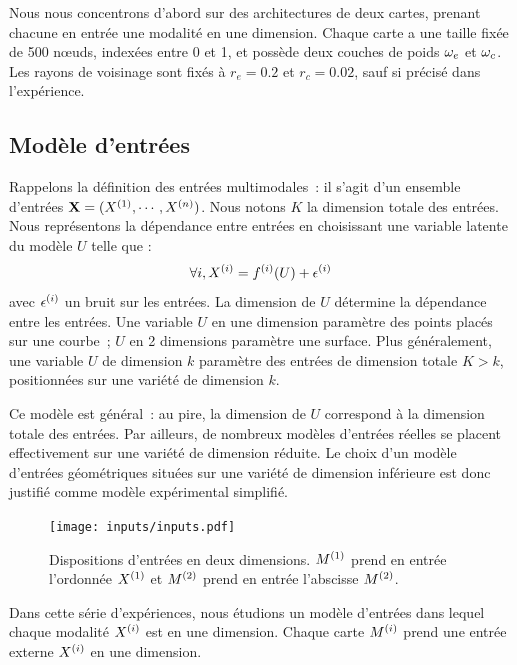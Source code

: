 \documentclass[../main]{subfiles}
\begin{document}
Nous nous concentrons d'abord sur des architectures de deux cartes, prenant chacune en entrée une modalité en une dimension.
Chaque carte a une taille fixée de 500 n\oe{}uds, indexées entre 0 et 1, et possède deux couches de poids $\omega_e$ et $\omega_c$. Les rayons de voisinage sont fixés à $r_e = 0.2$ et $r_c = 0.02$, sauf si précisé dans l'expérience.

\subsection{Modèle d'entrées}

Rappelons la définition des entrées multimodales~: il s'agit d'un ensemble d'entrées $\mathbf{X} = (X^{({1})}, \cdots, X^{({n})})$. Nous notons $K$ la dimension totale des entrées.
Nous représentons la dépendance entre entrées en choisissant une variable latente du modèle $U$ telle que :
$$ \forall i, X^{({i})} = f^{({i})}(U) + \epsilon^{({i})}$$
avec $\epsilon^{({i})}$ un bruit sur les entrées.
La dimension de $U$ détermine la dépendance entre les entrées.
Une variable $U$ en une dimension paramètre des points placés sur une courbe~; $U$ en 2 dimensions paramètre une surface. Plus généralement, une variable $U$ de dimension $k$ paramètre des entrées de dimension totale $K > k$, positionnées sur une variété de dimension $k$.

Ce modèle est général~: au pire, la dimension de $U$ correspond à la dimension totale des entrées. 
Par ailleurs, de nombreux modèles d'entrées réelles se placent effectivement sur une variété de dimension réduite. Le choix d'un modèle d'entrées géométriques situées sur une variété de dimension inférieure est donc justifié comme modèle expérimental simplifié.

\begin{figure}[ht]
	\texttt{[image: inputs/inputs.pdf]}
	\caption{Dispositions d'entrées en deux dimensions. $M^{({1})}$ prend en entrée l'ordonnée $X^{({1})}$ et $M^{({2})}$ prend en entrée l'abscisse $M^{({2})}$. \label{fig:input_list}}
\end{figure}

Dans cette série d'expériences, nous étudions un modèle d'entrées dans lequel chaque modalité $X^{({i})}$ est en une dimension. Chaque carte $M^{({i})}$ prend une entrée externe $X^{({i})}$ en une dimension.
\end{document}
